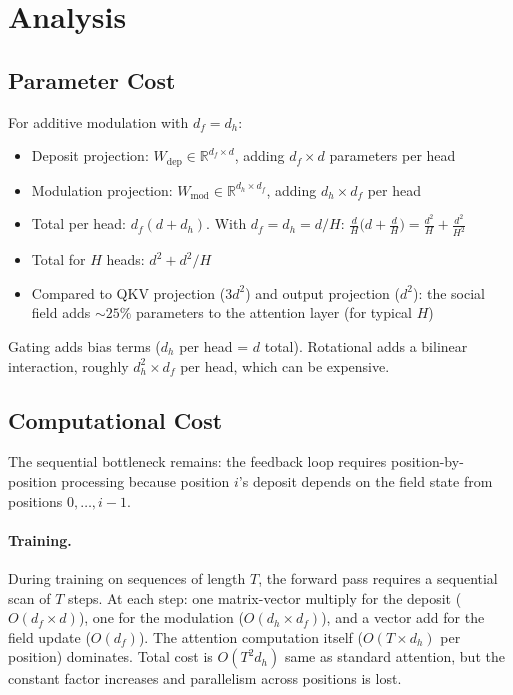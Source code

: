 \documentclass[11pt,a4paper]{article}
\newcommand{\R}{\mathbb{R}}
\begin{document}
\section{Analysis}
\label{sec:analysis}

\subsection{Parameter Cost}

For additive modulation with $d_f = d_h$:
\begin{itemize}
    \item Deposit projection: $W_{\text{dep}} \in \R^{d_f \times d}$,
          adding $d_f \times d$ parameters per head
    \item Modulation projection: $W_{\text{mod}} \in
          \R^{d_h \times d_f}$, adding $d_h \times d_f$ per head
    \item Total per head: $d_f(d + d_h)$. With $d_f = d_h = d/H$:
          $\frac{d}{H}\bigl(d + \frac{d}{H}\bigr)
          = \frac{d^2}{H} + \frac{d^2}{H^2}$
    \item Total for $H$ heads: $d^2 + d^2/H$
    \item Compared to QKV projection ($3d^2$) and output projection
          ($d^2$): the social field adds $\sim 25\%$ parameters to
          the attention layer (for typical $H$)
\end{itemize}

Gating adds bias terms ($d_h$ per head = $d$ total).  Rotational
adds a bilinear interaction, roughly $d_h^2 \times d_f$ per head,
which can be expensive.

\subsection{Computational Cost}

The sequential bottleneck remains: the feedback loop requires
position-by-position processing because position $i$'s deposit
depends on the field state from positions $0, \ldots, i-1$.

\paragraph{Training.}  During training on sequences of length $T$,
the forward pass requires a sequential scan of $T$ steps.  At each
step: one matrix-vector multiply for the deposit ($O(d_f \times d)$),
one for the modulation ($O(d_h \times d_f)$), and a vector add for
the field update ($O(d_f)$).  The attention computation itself
($O(T \times d_h)$ per position) dominates.  Total cost is
$O(T^2 d_h)$ same as standard attention, but the constant factor
increases and parallelism across positions is lost.
\end{document}
